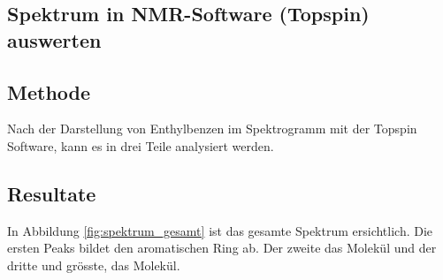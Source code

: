 \documentclass[a4paper]{article}
\newenvironment{Figure}
	{\par\medskip\noindent\minipage{\linewidth}}
	{\endminipage\par\medskip}
\begin{document}
	\begin{multicols}{2}
		\section{Spektrum in NMR-Software (Topspin) auswerten}
		
			\subsection{Methode}
			
			Nach der Darstellung von Enthylbenzen im Spektrogramm mit der Topspin Software, 
			kann es in drei Teile analysiert werden.
		
			\begin{Figure}
				\centering
				\label{fig:molekul}
				\vspace*{0.5mm}
			\end{Figure}
		
			\subsection{Resultate}
				
				In Abbildung \ref{fig:spektrum_gesamt} ist das gesamte Spektrum ersichtlich.
				Die ersten Peaks bildet den aromatischen Ring ab. Der zweite das 
				Molekül und der dritte und grösste, das  Molekül.
				

\end{multicols}
\end{document}
